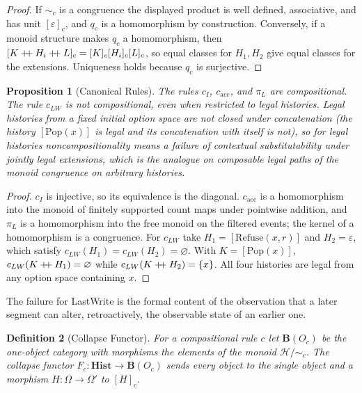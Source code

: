 \documentclass[12pt,oneside,openany]{book}
\theoremstyle{spherepop}
\newtheorem{definition}{Definition}[chapter]
\newtheorem{proposition}[definition]{Proposition}
\theoremstyle{remarkstyle}
\newcommand{\Hist}{\mathbf{Hist}}
\newcommand{\Pop}{\mathrm{Pop}}
\newcommand{\Rfuse}{\mathrm{Refuse}}
\newcommand{\hconcat}{\mathbin{+\mkern-5mu+}}
\newcommand{\calH}{\mathcal{H}}
\begin{document}
\begin{proof}
If $\sim_c$ is a congruence the displayed product is well defined, associative, and has unit $[\varepsilon]_c$, and $q_c$ is a homomorphism by construction. Conversely, if a monoid structure makes $q_c$ a homomorphism, then $[K\hconcat H_i\hconcat L]_c=[K]_c[H_i]_c[L]_c$, so equal classes for $H_1,H_2$ give equal classes for the extensions. Uniqueness holds because $q_c$ is surjective.
\end{proof}

\begin{proposition}[Canonical Rules]
\label{prop:canonical-compositional}
The rules $c_I$, $c_{\mathrm{acc}}$, and $\pi_L$ are compositional. The rule $c_{LW}$ is not compositional, even when restricted to legal histories. Legal histories from a fixed initial option space are not closed under concatenation (the history $[\Pop(x)]$ is legal and its concatenation with itself is not), so for legal histories noncompositionality means a failure of contextual substitutability under jointly legal extensions, which is the analogue on composable legal paths of the monoid congruence on arbitrary histories.
\end{proposition}

\begin{proof}
$c_I$ is injective, so its equivalence is the diagonal. $c_{\mathrm{acc}}$ is a homomorphism into the monoid of finitely supported count maps under pointwise addition, and $\pi_L$ is a homomorphism into the free monoid on the filtered events; the kernel of a homomorphism is a congruence. For $c_{LW}$ take $H_1=[\Rfuse(x,r)]$ and $H_2=\varepsilon$, which satisfy $c_{LW}(H_1)=c_{LW}(H_2)=\varnothing$. With $K=[\Pop(x)]$, $c_{LW}(K\hconcat H_1)=\varnothing$ while $c_{LW}(K\hconcat H_2)=\{x\}$. All four histories are legal from any option space containing $x$.
\end{proof}

The failure for LastWrite is the formal content of the observation that a later segment can alter, retroactively, the observable state of an earlier one.

\begin{definition}[Collapse Functor]
\label{def:collapse-functor}
For a compositional rule $c$ let $\mathbf B(O_c)$ be the one-object category with morphisms the elements of the monoid $\calH/{\sim_c}$. The \emph{collapse functor} $F_c:\Hist\to\mathbf B(O_c)$ sends every object to the single object and a morphism $H:\Omega\to\Omega'$ to $[H]_c$.
\end{definition}
\end{document}
